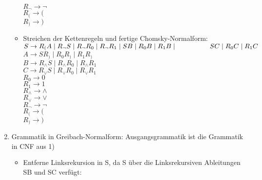 \documentclass[11pt]{article}
\begin{document}
\begin{enumerate}
\begin{itemize}
\\\hspace*{6mm} $R_{\neg} \rightarrow \neg$
\\\hspace*{6mm} $R_{(} \rightarrow ($
\\\hspace*{6mm} $R_{)} \rightarrow )$
\\\hspace*{6mm}
\item Streichen der Kettenregeln und fertige Chomsky-Normalform:
\\\hspace*{6mm} $S \rightarrow R_{(}A\mid R_{\neg} S \mid R_{\neg} R_{0} \mid R_{\neg} R_{1} \mid S B \mid R_{0}B \mid R_{1}B \mid \hspace*{17mm} SC \mid R_{0} C \mid R_{1}C$
\\\hspace*{6mm} $A \rightarrow SR_{)} \mid R_{0}R_{)}\mid R_{1}R_{)}$
\\\hspace*{6mm} $B \rightarrow R_{\wedge} S \mid R_{\wedge}R_{0} \mid R_{\wedge}R_{1}$
\\\hspace*{6mm} $C \rightarrow R_{\vee} S \mid R_{\vee}R_{0} \mid R_{\vee}R_{1}$
\\\hspace*{6mm} $R_{0} \rightarrow 0$
\\\hspace*{6mm} $R_{1} \rightarrow 1$
\\\hspace*{6mm} $R_{\wedge} \rightarrow \wedge$
\\\hspace*{6mm} $R_{\vee} \rightarrow \vee$
\\\hspace*{6mm} $R_{\neg} \rightarrow \neg$
\\\hspace*{6mm} $R_{(} \rightarrow ($
\\\hspace*{6mm} $R_{)} \rightarrow )$
\\\hspace*{6mm}
\end{itemize}
\item Grammatik in Greibach-Normalform: Ausgangsgrammatik ist die Grammatik in CNF aus 1)
\begin{itemize}
\item Entferne Linksrekursion in S, da S über die Linksrekursiven Ableitungen SB und SC verfügt:

\end{itemize}
\end{enumerate}
\end{document}
